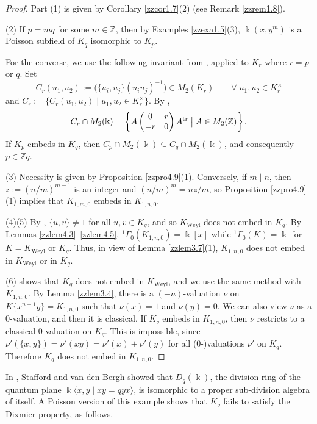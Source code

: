 \documentclass[12pt]{amsart}
\theoremstyle{plain}
\numberwithin{theorem}{section}
\numberwithin{equation}{theorem}
\theoremstyle{definition}
\newcommand{\ZZ}{\mathbb{Z}}
\DeclareMathOperator{\Weyl}{Weyl}
\newcommand \Kweyl {K_{\Weyl}}
\begin{document}
\begin{proof}
Part (1) is given by Corollary \ref{zzcor1.7}(2) (see Remark \ref{zzrem1.8}).

(2) If $p = mq$ for some $m \in \ZZ$, then by Examples \ref{zzexa1.5}(3), $\Bbbk(x,y^m)$ is a Poisson subfield of $K_q$ isomorphic to $K_p$.

For the converse, we use the following invariant from \cite{GoLa}, applied to $K_r$ where $r = p$ or $q$.  Set 
$$
C_r(u_1,u_2) := \bigl( \{u_i,u_j\}(u_iu_j)^{-1} \bigr) \in M_2(K_r) \qquad \forall\; u_1,u_2 \in K_r^\times
$$
and $C_r := \{ C_r(u_1,u_2) \mid u_1,u_2 \in K_r^\times \}$.  By \cite[Proposition 5.2(b)]{GoLa},
$$
C_r \cap M_2(\Bbbk) = \left\{ A \begin{pmatrix} 0&r\\ -r&0 \end{pmatrix} A^{\text{tr}} \bigm| A \in M_2(\ZZ) \right\}.
$$
If $K_p$ embeds in $K_q$, then $C_p \cap M_2(\Bbbk) \subseteq C_q \cap M_2(\Bbbk)$, and consequently $p \in \ZZ q$.

(3) Necessity is given by Proposition
\ref{zzpro4.9}(1).  Conversely, if 
$m \mid n$, then $z := (n/m)^{m-1}$ is 
an integer and $(n/m)^m = nz/m$, so 
Proposition \ref{zzpro4.9}(1) implies 
that $K_{1,m,0}$ embeds in $K_{1,n,0}$.

(4)(5) By \cite[Proposition 5.2(a)]{GoLa}, 
$\{u,v\} \ne 1$ for all $u,v \in K_q$, 
and so $\Kweyl$ does not embed in $K_q$. 
By Lemmas \ref{zzlem4.3}--\ref{zzlem4.5}, 
$^1\Gamma_0(K_{1,n,0}) = \Bbbk[x]$ while 
$^1\Gamma_0(K) = \Bbbk$ for $K = \Kweyl$ 
or $K_q$.  Thus, in view of Lemma 
\ref{zzlem3.7}(1), $K_{1,n,0}$ does not embed in $\Kweyl$ or in $K_q$.

(6) \cite[Corollary 5.9(2)]{HTWZ2} shows that $K_q$ does not embed in $\Kweyl$, and we use the same method with $K_{1,n,0}$.  By Lemma \ref{zzlem3.4}, there is a $(-n)$-valuation $\nu$ on $K\{x^{n+1}y\} = K_{1,n,0}$ such that $\nu(x) = 1$ and $\nu(y) = 0$.  We can also view $\nu$ as a $0$-valuation, and then it is classical.  If $K_q$ embeds in $K_{1,n,0}$, then $\nu$ restricts to a classical $0$-valuation on $K_q$.  This is impossible, since $\nu'(\{x,y\}) = \nu'(xy) = \nu'(x) + \nu'(y)$ for all ($0$-)valuations $\nu'$ on $K_q$. Therefore $K_q$ does not embed in $K_{1,n,0}$.
\end{proof}

In \cite[\S13.6]{SvdB}, Stafford and van den Bergh showed that $D_q(\Bbbk)$, the division ring of the quantum plane $\Bbbk \langle x,y \mid xy = qyx \rangle$, is isomorphic to a proper sub-division algebra of itself.  A Poisson version of this example shows that $K_q$ fails to satisfy the Dixmier property, as follows.
\end{document}
